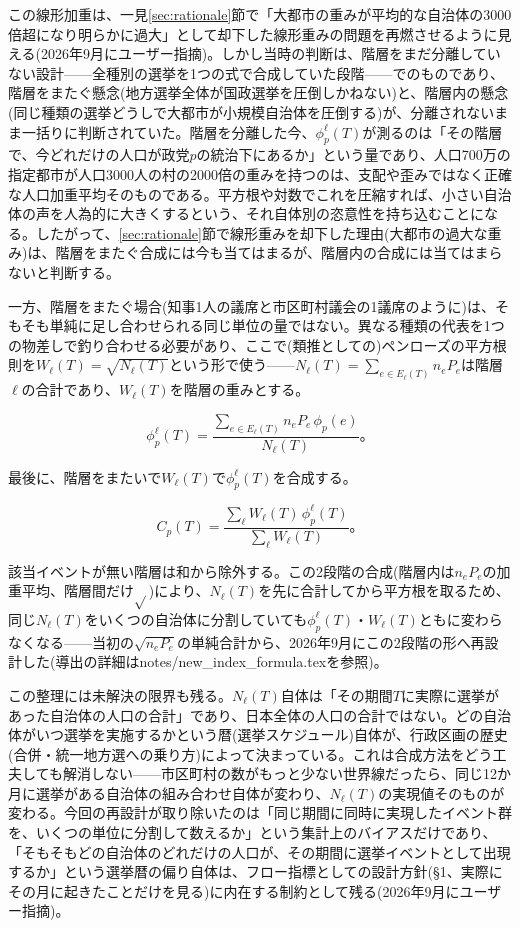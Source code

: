 \documentclass[a4paper,11pt]{ltjsarticle}
\begin{document}
この線形加重は、一見\ref{sec:rationale}節で「大都市の重みが平均的な自治体の3000倍超になり明らかに過大」として却下した線形重みの問題を再燃させるように見える(2026年9月にユーザー指摘)。しかし当時の判断は、階層をまだ分離していない設計——全種別の選挙を1つの式で合成していた段階——でのものであり、階層をまたぐ懸念(地方選挙全体が国政選挙を圧倒しかねない)と、階層内の懸念(同じ種類の選挙どうしで大都市が小規模自治体を圧倒する)が、分離されないまま一括りに判断されていた。階層を分離した今、$\phi_p^\ell(T)$が測るのは「その階層で、今どれだけの人口が政党$p$の統治下にあるか」という量であり、人口700万の指定都市が人口3000人の村の2000倍の重みを持つのは、支配や歪みではなく正確な人口加重平均そのものである。平方根や対数でこれを圧縮すれば、小さい自治体の声を人為的に大きくするという、それ自体別の恣意性を持ち込むことになる。したがって、\ref{sec:rationale}節で線形重みを却下した理由(大都市の過大な重み)は、階層をまたぐ合成には今も当てはまるが、階層内の合成には当てはまらないと判断する。

一方、階層をまたぐ場合(知事1人の議席と市区町村議会の1議席のように)は、そもそも単純に足し合わせられる同じ単位の量ではない。異なる種類の代表を1つの物差しで釣り合わせる必要があり、ここで(類推としての)ペンローズの平方根則を$W_\ell(T)=\sqrt{N_\ell(T)}$という形で使う——$N_\ell(T)=\sum_{e\in E_\ell(T)} n_eP_e$は階層$\ell$の合計であり、$W_\ell(T)$を階層の重みとする。

\[
\phi_p^\ell(T) = \frac{\displaystyle\sum_{e\in E_\ell(T)} n_eP_e\,\phi_p(e)}{N_\ell(T)}。
\]

最後に、階層をまたいで$W_\ell(T)$で$\phi_p^\ell(T)$を合成する。

\[
C_p(T) = \frac{\displaystyle\sum_{\ell} W_\ell(T)\,\phi_p^\ell(T)}
               {\displaystyle\sum_{\ell} W_\ell(T)}。
\]

該当イベントが無い階層は和から除外する。この2段階の合成(階層内は$n_eP_e$の加重平均、階層間だけ$\sqrt{}$)により、$N_\ell(T)$を先に合計してから平方根を取るため、同じ$N_\ell(T)$をいくつの自治体に分割していても$\phi_p^\ell(T)$・$W_\ell(T)$ともに変わらなくなる——当初の$\sqrt{n_eP_e}$の単純合計から、2026年9月にこの2段階の形へ再設計した(導出の詳細はnotes/new\_index\_formula.texを参照)。

この整理には未解決の限界も残る。$N_\ell(T)$自体は「その期間$T$に実際に選挙があった自治体の人口の合計」であり、日本全体の人口の合計ではない。どの自治体がいつ選挙を実施するかという暦(選挙スケジュール)自体が、行政区画の歴史(合併・統一地方選への乗り方)によって決まっている。これは合成方法をどう工夫しても解消しない——市区町村の数がもっと少ない世界線だったら、同じ12か月に選挙がある自治体の組み合わせ自体が変わり、$N_\ell(T)$の実現値そのものが変わる。今回の再設計が取り除いたのは「同じ期間に同時に実現したイベント群を、いくつの単位に分割して数えるか」という集計上のバイアスだけであり、「そもそもどの自治体のどれだけの人口が、その期間に選挙イベントとして出現するか」という選挙暦の偏り自体は、フロー指標としての設計方針(\S1、実際にその月に起きたことだけを見る)に内在する制約として残る(2026年9月にユーザー指摘)。
\end{document}
